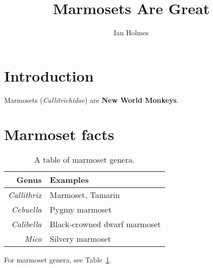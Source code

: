 \documentclass{article}
\title{Marmosets Are Great}
\author{Ian Holmes}
\begin{document}
\maketitle
{}

\section{Introduction}
Marmosets ({\em Callitrichidae})
are {\bf New World Monkeys}.

\section{Marmoset facts}

\begin{table}
\begin{tabular}{rl}
Genus & Examples \\
\hline
{\em Callithrix} & Marmoset, Tamarin \\
{\em Cebuella} & Pygmy marmoset \\
{\em Calibella} & Black-crowned dwarf marmoset \\
{\em Mico} & Silvery marmoset \\
\end{tabular}
\caption{
\label{MarmosetFacts}
A table of marmoset genera.
}
\end{table}

For marmoset genera, see Table~\ref{MarmosetFacts}.
\end{document}
